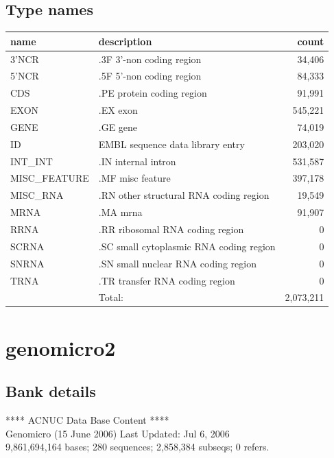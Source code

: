 \documentclass{article}
\begin{document}
\begin{Schunk}
\subsection{Type names}
\noindent\begin{tabular}{llr}
\hline \hline
name & description & count \\
\hline
3'NCR  &  .3F  3'-non coding region  &  34,406 \\
5'NCR  &  .5F  5'-non coding region  &  84,333 \\
CDS  &  .PE protein coding region  &  91,991 \\
EXON  &  .EX exon  &  545,221 \\
GENE  &  .GE gene  &  74,019 \\
ID  &  EMBL sequence data library entry  &  203,020 \\
INT\_INT  &  .IN  internal intron  &  531,587 \\
MISC\_FEATURE  &  .MF misc feature  &  397,178 \\
MISC\_RNA  &  .RN other structural RNA coding region  &  19,549 \\
MRNA  &  .MA mrna  &  91,907 \\
RRNA  &  .RR ribosomal RNA coding region  &  0 \\
SCRNA  &  .SC small cytoplasmic RNA coding region  &  0 \\
SNRNA  &  .SN small nuclear RNA coding region  &  0 \\
TRNA  &  .TR transfer RNA coding region  &  0 \\
\hline
 & Total: & 2,073,211 \\
\hline \hline
\end{tabular}

\section{ genomicro2 }
\subsection{Bank details}
             ****     ACNUC Data Base Content      ****                         \\
              Genomicro (15 June 2006) Last Updated: Jul  6, 2006\\
9,861,694,164 bases; 280 sequences; 2,858,384 subseqs; 0 refers.\\
\\
\\



\end{Schunk}
\end{document}
